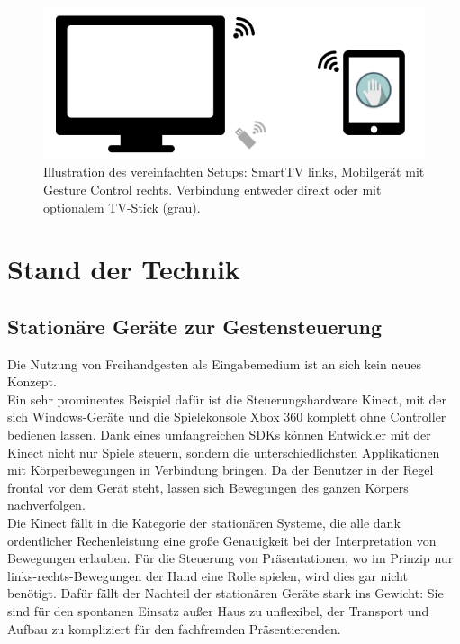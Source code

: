 \documentclass{article}
\begin{document}
\begin{figure}[htb]
\begin{minipage}[b]{1.0\linewidth}
  \centering
\centerline{\includegraphics[width=1\linewidth]{aufbau.jpg}}
\end{minipage}
\caption{Illustration des vereinfachten Setups: SmartTV links, Mobilgerät mit Gesture Control rechts. Verbindung entweder direkt oder mit optionalem TV-Stick (grau).}
\label{fig:setup}
\end{figure}


\section{Stand der Technik}
\subsection{Stationäre Geräte zur Gestensteuerung}
Die Nutzung von Freihandgesten als Eingabemedium ist an sich kein neues Konzept.\\
Ein sehr prominentes Beispiel dafür ist die Steuerungshardware Kinect, mit der sich Windows-Geräte und die Spielekonsole Xbox 360 komplett ohne Controller bedienen lassen. Dank eines umfangreichen SDKs können Entwickler mit der Kinect nicht nur Spiele steuern, sondern die unterschiedlichsten Applikationen mit Körperbewegungen in Verbindung bringen. Da der Benutzer in der Regel frontal vor dem Gerät steht, lassen sich Bewegungen des ganzen Körpers nachverfolgen.\\ 
Die Kinect fällt in die Kategorie der stationären Systeme, die alle dank ordentlicher Rechenleistung eine große Genauigkeit bei der Interpretation von Bewegungen erlauben. Für die Steuerung von Präsentationen, wo im Prinzip nur links-rechts-Bewegungen der Hand eine Rolle spielen, wird dies gar nicht benötigt. Dafür fällt der Nachteil der stationären Geräte stark ins Gewicht: Sie sind für den spontanen Einsatz außer Haus zu unflexibel, der Transport und Aufbau zu kompliziert für den fachfremden Präsentierenden.
\end{document}
